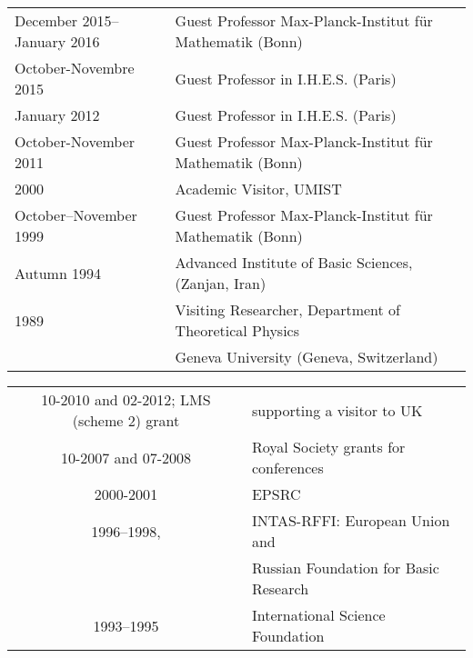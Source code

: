 \documentclass[12pt]{article}
\newcommand{\punkt}{\par\medskip\noindent}
\begin{document}
 \begin{tabular}{ll}

December 2015--January 2016
        & Guest Professor
         Max-Planck-Institut f\"ur Mathematik (Bonn)\\



October-Novembre  2015
        & Guest Professor
         in I.H.E.S. (Paris)\\

January 2012
        & Guest Professor
         in I.H.E.S. (Paris)\\



October-November 2011
        & Guest Professor
         Max-Planck-Institut f\"ur Mathematik (Bonn)\\


         2000
        & Academic Visitor, UMIST \\

October--November  1999
        & Guest Professor
         Max-Planck-Institut f\"ur Mathematik (Bonn)\\




   Autumn 1994
        &  Advanced Institute of
       Basic Sciences, (Zanjan, Iran)\\

    1989 &     Visiting Researcher,
          Department of Theoretical Physics\\
        &  Geneva University (Geneva, Switzerland)\\

 \end{tabular}




\punkt {\bf  Research grants:}



 \smallskip\noindent
 \begin{tabular}{cl}

  10-2010 and 02-2012; LMS (scheme 2) grant & supporting a visitor to UK\\


     10-2007 and 07-2008 & Royal Society grants for conferences\\
    2000-2001  & EPSRC\\
    1996--1998, &  INTAS-RFFI: European Union and\\
                &  Russian Foundation for Basic Research
    \smallskip\\
    1993--1995  & International Science Foundation
  \end{tabular}
\end{document}
